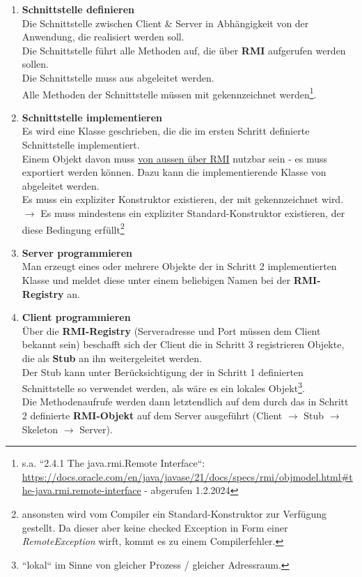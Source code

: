 \begin{enumerate}
    \item\label{itm:intdef} \textbf{Schnittstelle definieren}\\
    \noindent
    Die Schnittstelle zwischen Client & Server in Abhängigkeit von der Anwendung, die realisiert werden soll.\\
    \noindent
    Die Schnittstelle führt alle Methoden auf, die über \textbf{RMI} aufgerufen werden sollen.\\
    \noindent
    Die Schnittstelle muss aus  abgeleitet werden.\\
    \noindent
    Alle Methoden der Schnittstelle müssen mit  gekennzeichnet werden\footnote{
    s.a. ``2.4.1 The java.rmi.Remote Interface``: \url{https://docs.oracle.com/en/java/javase/21/docs/specs/rmi/objmodel.html#the-java.rmi.remote-interface} - abgerufen 1.2.2024
    }.

    \item \textbf{Schnittstelle implementieren}\\
    \noindent
    Es wird eine Klasse geschrieben, die die im ersten Schritt definierte Schnittstelle implementiert.\\
    \noindent
    Einem Objekt davon muss \ul{von aussen über RMI} nutzbar sein - es muss exportiert werden können.
    Dazu kann die implementierende Klasse von  abgeleitet werden.\\
    Es muss ein expliziter Konstruktor existieren, der mit  gekennzeichnet wird. \\
    $\rightarrow$ Es muss mindestens ein expliziter Standard-Konstruktor existieren, der diese Bedingung erfüllt\footnote{
    ansonsten wird vom Compiler ein Standard-Konstruktor zur Verfügung gestellt.
    Da dieser aber keine checked Exception in Form einer \textit{RemoteException} wirft, kommt es zu einem Compilerfehler.
    }

    \item \textbf{Server programmieren}\\
    \noindent
    Man erzeugt eines oder mehrere Objekte der in Schritt 2 implementierten Klasse und meldet diese unter einem beliebigen Namen bei der \textbf{RMI-Registry} an.

    \item \textbf{Client programmieren}\\
    \noindent
    Über die \textbf{RMI-Registry} (Serveradresse und Port müssen dem Client bekannt sein) beschafft sich der Client die in Schritt 3 registrieren Objekte, die als \textbf{Stub} an ihn weitergeleitet werden.\\
    \noindent
    Der Stub kann unter Berücksichtigung der in Schritt 1 definierten Schnittstelle so verwendet werden, als wäre es ein lokales Objekt\footnote{
    ``lokal`` im Sinne von gleicher Prozess / gleicher Adressraum.
    }.\\
    \noindent
    Die Methodenaufrufe werden dann letztendlich auf dem durch das in Schritt 2 definierte \textbf{RMI-Objekt} auf dem Server ausgeführt (Client $\rightarrow$ Stub $\rightarrow$ Skeleton $\rightarrow$ Server).


\end{enumerate}
